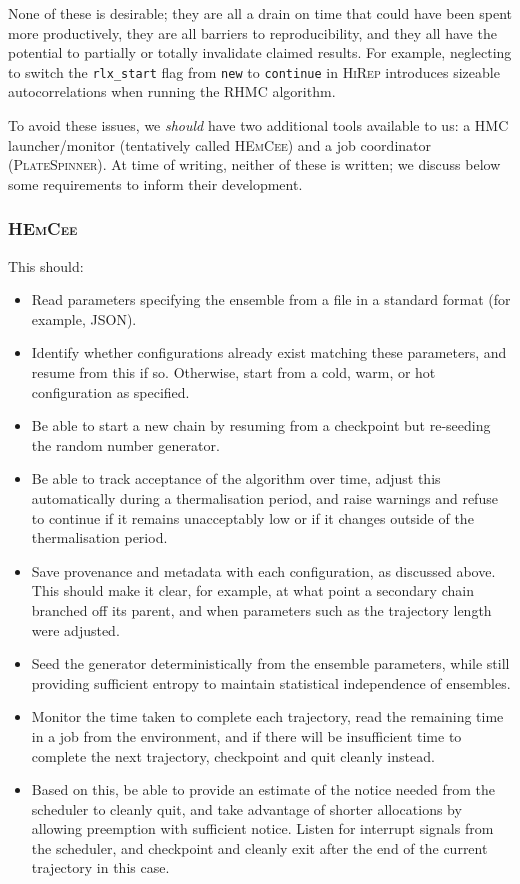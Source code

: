\documentclass{article}
\newcommand\rfcword[1]{\emph{#1}\xspace}
\newcommand\should{\rfcword{should}}
\newcommand\program[1]{\textsc{#1}\xspace}
\begin{document}
None of these is desirable;
they are all a drain on time that could have been spent more productively,
they are all barriers to reproducibility,
and they all have the potential to partially or totally invalidate claimed results.
For example,
neglecting to switch the \verb|rlx_start| flag from \verb|new| to \verb|continue|
in \program{HiRep}
introduces sizeable autocorrelations when running the RHMC algorithm.

To avoid these issues,
we \should have two additional tools available to us:
a HMC launcher/monitor
(tentatively called \program{HEmCee})
and a job coordinator
(\program{PlateSpinner}).
At time of writing,
neither of these is written;
we discuss below some requirements to inform their development.

\subsubsection{\program{HEmCee}}

This should:

\begin{itemize}
  \item
        Read parameters specifying the ensemble from a file in a standard format
        (for example, JSON).
  \item
        Identify whether configurations already exist matching these parameters,
        and resume from this if so.
        Otherwise,
        start from a cold, warm, or hot configuration as specified.
  \item
        Be able to start a new chain by resuming from a checkpoint
        but re-seeding the random number generator.
  \item
        Be able to track acceptance of the algorithm over time,
        adjust this automatically during a thermalisation period,
        and raise warnings and refuse to continue if it remains unacceptably low
        or if it changes outside of the thermalisation period.
  \item
        Save provenance and metadata with each configuration,
        as discussed above.
        This should make it clear,
        for example,
        at what point a secondary chain branched off its parent,
        and when parameters such as the trajectory length were adjusted.
  \item
        Seed the generator deterministically from the ensemble parameters,
        while still providing sufficient entropy to maintain statistical independence of ensembles.
  \item
        Monitor the time taken to complete each trajectory,
        read the remaining time in a job from the environment,
        and if there will be insufficient time to complete the next trajectory,
        checkpoint and quit cleanly instead.
  \item
        Based on this,
        be able to provide an estimate of the notice needed from the scheduler to cleanly quit,
        and take advantage of shorter allocations by allowing preemption with sufficient notice.
        Listen for interrupt signals from the scheduler,
        and checkpoint and cleanly exit after the end of the current trajectory in this case.
\end{itemize}
\end{document}

